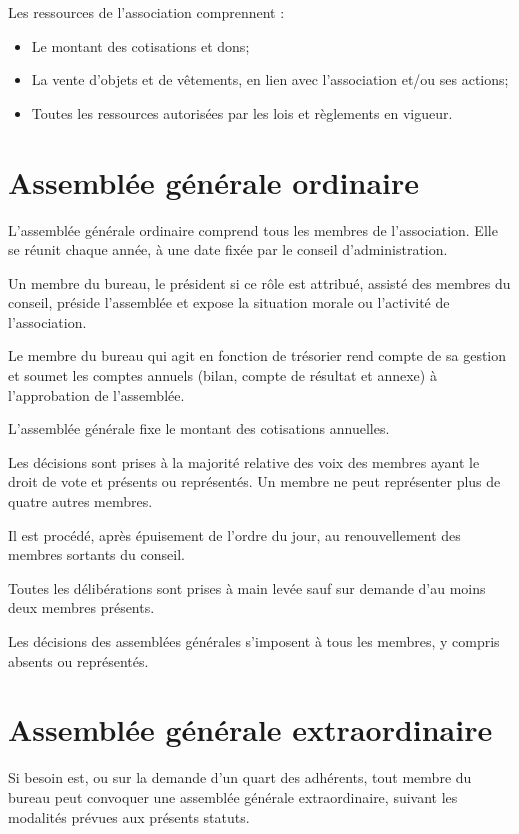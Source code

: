 \documentclass[11 pt]{article}
\begin{document}
Les ressources de l’association comprennent :

\begin{itemize}
\item Le montant des cotisations et dons;
\item La vente d’objets et de vêtements, en lien avec l’association
  et/ou ses actions;
\item Toutes les ressources autorisées par les lois et règlements en
  vigueur.
\end{itemize}


\section{Assemblée générale ordinaire}

L’assemblée générale ordinaire comprend tous les membres de
l’association. Elle se réunit chaque année, à une date fixée par le
conseil d’administration.

Un membre du bureau, le président si ce rôle est attribué, assisté des
membres du conseil, préside l’assemblée et expose la situation morale
ou l’activité de l’association.

Le membre du bureau qui agit en fonction de trésorier rend compte de
sa gestion et soumet les comptes annuels (bilan, compte de résultat et
annexe) à l’approbation de l’assemblée.

L’assemblée générale fixe le montant des cotisations annuelles.

Les décisions sont prises à la majorité relative des voix des membres
ayant le droit de vote et présents ou représentés. Un membre ne peut
représenter plus de quatre autres membres.

Il est procédé, après épuisement de l’ordre du jour, au renouvellement
des membres sortants du conseil.

Toutes les délibérations sont prises à main levée sauf sur demande
d’au moins deux membres présents.

Les décisions des assemblées générales s’imposent à tous les membres,
y compris absents ou représentés.


\section{Assemblée générale extraordinaire}

Si besoin est, ou sur la demande d’un quart des adhérents, tout membre
du bureau peut convoquer une assemblée générale extraordinaire,
suivant les modalités prévues aux présents statuts.
\end{document}
